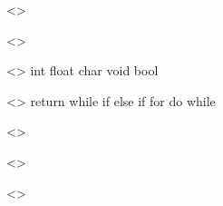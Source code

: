 \begin{obeliskgrammar}
<\typeUNDERSCORE{}> \gramdef{} \basicUNDERSCOREtype*{}
  \grambar \noUNDERSCOREmultidim*{} \LSBRACK*{} \RSBRACK*{}
  \grambar \noUNDERSCOREmultidim*{} \LSBRACK*{} \TUNDERSCOREINT*{}
           \RSBRACK*{}
  \grambar \REF*{} \basicUNDERSCOREtype*{}

<\noUNDERSCOREmultidim{}> \gramdef{} \basicUNDERSCOREtype*{}
  \grambar \REF*{} \basicUNDERSCOREtype*{}

<\basicUNDERSCOREtype{}> \gramdef{} int
  \grambar float
  \grambar char
  \grambar void
  \grambar bool

<\stmt{}> \gramdef{} return \gramopt{\expr*{}} \SEMICOLON*{}
  \grambar \gramopt{\expr*{}} \SEMICOLON*{}
  \grambar \block*{}
  \grambar while \LRBRACK*{} \expr*{} \RRBRACK*{} \stmt*{}
  \grambar if \LRBRACK*{} \expr*{} \RRBRACK*{} \stmt*{} else \stmt*{}
  \grambar if \LRBRACK*{} \expr*{} \RRBRACK*{} \stmt*{}
  \grambar for \LRBRACK*{} \gramopt{\expr*{}} \SEMICOLON*{}
           \gramopt{\expr*{}} \SEMICOLON*{} \gramopt{\expr*{}} \RRBRACK*{}
           \stmt*{}
  \grambar do \stmt*{} while \LRBRACK*{} \expr*{} \RRBRACK*{} \SEMICOLON*{}

<\expr{}> \gramdef{} \TUNDERSCOREINT*{}
  \grambar \TUNDERSCOREFLOAT*{}
  \grambar \TUNDERSCORECHAR*{}
  \grambar \TUNDERSCOREBOOL*{}
  \grambar \LRBRACK*{} \expr*{} \RRBRACK*{}
  \grambar \REF*{} \lUNDERSCOREvalue*{}
  \grambar \lUNDERSCOREvalue*{} \ASSIGN*{} \expr*{}
  \grambar \lUNDERSCOREvalue*{} \PASSIGN*{} \expr*{}
  \grambar \lUNDERSCOREvalue*{} \MINASSIGN*{} \expr*{}
  \grambar \lUNDERSCOREvalue*{} \TASSIGN*{} \expr*{}
  \grambar \lUNDERSCOREvalue*{} \DASSIGN*{} \expr*{}
  \grambar \lUNDERSCOREvalue*{} \MODASSIGN*{} \expr*{}
  \grambar \NOT*{} \expr*{}
  \grambar \ID*{} \LRBRACK*{} \gramseplist{\COMMA*{}}{\expr*{}} \RRBRACK*{}
  \grambar \lUNDERSCOREvalue*{}
  \grambar \MINUS*{} \expr*{}
  \grambar \expr*{} \binUNDERSCOREop*{} \expr*{}
  \grambar \lUNDERSCOREvalue*{} \PLUSPLUS*{}
  \grambar \lUNDERSCOREvalue*{} \MINUSMINUS*{}
  \grambar \PLUSPLUS*{} \lUNDERSCOREvalue*{}
  \grambar \MINUSMINUS*{} \expr*{}

<\lUNDERSCOREvalue{}> \gramdef{} \ID*{}
  \grambar \ID*{} \LSBRACK*{} \expr*{} \RSBRACK*{}

<\binUNDERSCOREop{}> \gramdef{} \PLUS*{}
  \grambar \MINUS*{}
  \grambar \TIMES*{}
  \grambar \MOD*{}
  \grambar \DIV*{}
  \grambar \AND*{}
  \grambar \OR*{}
  \grambar \LESS*{}
  \grambar \GREATER*{}
  \grambar \LEQ*{}
  \grambar \GEQ*{}
  \grambar \EQUAL*{}
  \grambar \NEQ*{}

\end{obeliskgrammar}

